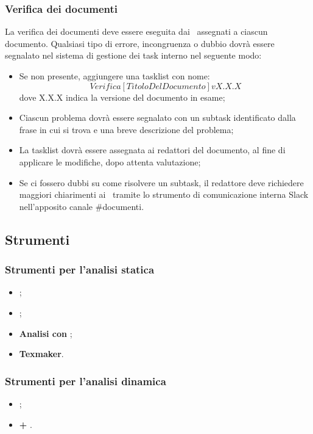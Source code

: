 \documentclass[../NormeDiProgetto.tex]{subfiles}
\begin{document}
\subsubsection{Verifica dei documenti}
	La verifica dei documenti deve essere eseguita dai \verificatori\ assegnati a ciascun documento. Qualsiasi tipo di errore, incongruenza o dubbio dovrà essere segnalato nel sistema di gestione dei task interno  nel seguente modo:
	\begin{itemize}
		\item Se non presente, aggiungere una tasklist con nome:\\
		\begin{equation*}
			Verifica [TitoloDelDocumento] vX.X.X
		\end{equation*}
		dove X.X.X indica la versione del documento in esame;
		\item Ciascun problema dovrà essere segnalato con un subtask identificato dalla frase in cui si trova e una breve descrizione del problema;
		\item La tasklist dovrà essere assegnata ai redattori del documento, al fine di applicare le modifiche, dopo attenta valutazione;
		\item Se ci fossero dubbi su come risolvere un subtask, il redattore deve richiedere maggiori chiarimenti ai \verificatori\ tramite lo strumento di comunicazione interna Slack nell'apposito canale \#documenti.
	\end{itemize}

\subsection{Strumenti}
\subsubsection{Strumenti per l'analisi statica}
\begin{itemize}
  \item \textbf{};
  \item \textbf{};
  \item \textbf{Analisi con };
  \item \textbf{Texmaker}.
\end{itemize}
\subsubsection{Strumenti per l'analisi dinamica}
\begin{itemize}
  \item \textbf{};
  \item \textbf{ + }.
\end{itemize}
\end{document}
